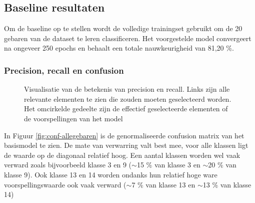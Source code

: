 \subsection{Baseline resultaten}
Om de baseline op te stellen wordt de volledige trainingset gebruikt om de 20 gebaren van de dataset te leren classificeren. Het voorgestelde model convergeert na ongeveer 250 epochs en behaalt een totale nauwkeurigheid van 81,20 \%.

\subsubsection{Precision, recall en confusion}\label{sec:pr-conf}
\begin{figure}
	\centering
	\def\svgwidth{0.7\columnwidth}
	
	\caption{Visualisatie van de betekenis van precision en recall. Links zijn alle relevante elementen te zien die zouden moeten geselecteerd worden. Het omcirkelde gedeelte zijn de effectief geselecteerde elementen of de voorspellingen van het model}
	\label{fig:prec+recall}
\end{figure}

\npar In Figuur \ref{fig:conf-allegebaren} is de genormaliseerde confusion matrix van het basismodel te zien. De mate van verwarring valt best mee, voor alle klassen ligt de waarde op de diagonaal relatief hoog. Een aantal klassen worden wel vaak verward zoals bijvoorbeeld klasse 3 en 9 ($\sim$15 \% van klasse 3 en $\sim$20 \% van klasse 9). Ook klasse 13 en 14 worden ondanks hun relatief hoge ware voorspellingswaarde ook vaak verward ($\sim$7 \% van klasse 13 en $\sim$13 \% van klasse 14)

